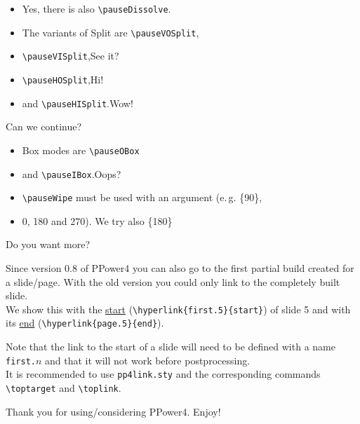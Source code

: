 \documentclass[30pt,landscape]{foils}
\begin{document}
\begin{itemize}
\item Yes, there is also \verb|\pauseDissolve|.\pauseDissolve
\item The variants of Split are \verb|\pauseVOSplit|,\pauseVOSplit
\item \verb|\pauseVISplit|,\dotfill See it?\pauseVISplit\null
\item \verb|\pauseHOSplit|,\dotfill Hi!\pauseHOSplit\null
\item and \verb|\pauseHISplit|.\dotfill Wow!\pauseHISplit\null
\end{itemize}
Can \dotfill{} we \dotfill{} continue?\null
{}
\begin{itemize}
\item Box modes are \verb|\pauseOBox|\pauseOBox
\item and \verb|\pauseIBox|.\dotfill Oops?\pauseIBox\null
\item \verb|\pauseWipe| must be used with an argument (e.\,g. \{90\},
\item 0, 180 and 270). We try also \{180\}\dotfill{}\null
\end{itemize}
Do \dotfill{} you \dotfill{} want \dotfill{} more?\null
{}
{\small
Since version 0.8 of PPower4 you can also go to the first
partial build created for a slide/page. With the old version you could
only link to the completely built slide.
\\
We show this with the
\hyperlink{first.5}{start} (\verb|\hyperlink{first.5}{start}|)
of slide 5 and with its
\hyperlink{page.5}{end} (\verb|\hyperlink{page.5}{end}|).

Note that the link to the start of a slide will need to be defined
with a name \verb|first.|$n$ and that it will not work before
postprocessing.\\
It is recommended to use \verb|pp4link.sty| and the
corresponding commands \verb|\toptarget| and \verb|\toplink|.

Thank you for using/considering PPower4. Enjoy!\par}
\end{document}
